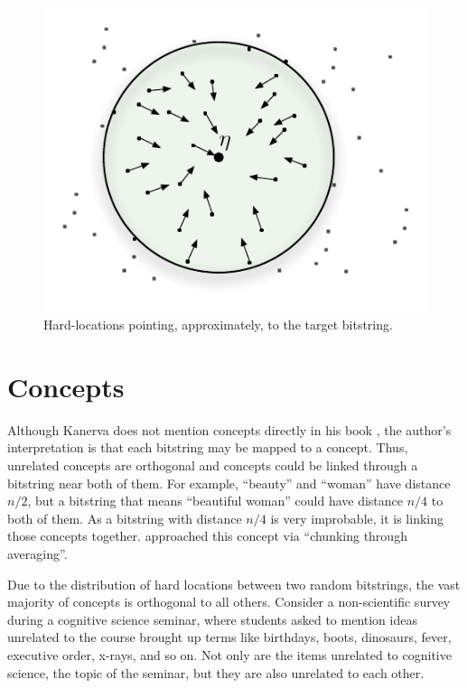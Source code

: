 \begin{figure}[!htb]
\centering\includegraphics[scale=0.75]{./images02/p1_after_write.pdf}

\caption{Hard-locations pointing, approximately, to the target bitstring.\label{fig-p1-pointers}}
\end{figure}



\section{Concepts}

Although Kanerva does not mention concepts directly in his book \citep{Kanerva1988}, the author's interpretation is that each bitstring may be mapped to a concept. Thus, unrelated concepts are orthogonal and concepts could be linked through a bitstring near both of them. For example, ``beauty'' and ``woman'' have distance $n/2$, but a bitstring that means ``beautiful woman'' could have distance $n/4$ to both of them. As a bitstring with distance $n/4$ is very improbable, it is linking those concepts together. \citet{Linhares2011} approached this concept via ``chunking through averaging''.

Due to the distribution of hard locations between two random bitstrings, the vast majority of concepts is orthogonal to all others. Consider a non-scientific survey during a cognitive science seminar, where students asked to mention ideas unrelated to the course brought up terms like birthdays, boots, dinosaurs, fever, executive order, x-rays, and so on. Not only are the items unrelated to cognitive science, the topic of the seminar, but they are also unrelated to each other.

